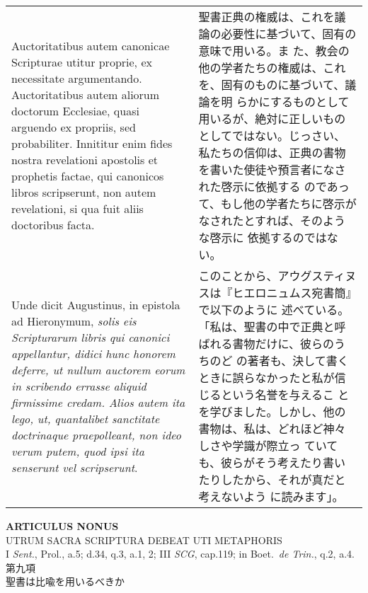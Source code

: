 \documentclass[10pt]{jsarticle}
\begin{document}
\begin{longtable}{p{21em}p{21em}}
\\

Auctoritatibus autem canonicae Scripturae utitur proprie, ex
necessitate argumentando. Auctoritatibus autem aliorum doctorum
Ecclesiae, quasi arguendo ex propriis, sed probabiliter. Innititur
enim fides nostra revelationi apostolis et prophetis factae, qui
canonicos libros scripserunt, non autem revelationi, si qua fuit aliis
doctoribus facta.


&

聖書正典の権威は、これを議論の必要性に基づいて、固有の意味で用いる。ま
た、教会の他の学者たちの権威は、これを、固有のものに基づいて、議論を明
らかにするものとして用いるが、絶対に正しいものとしてではない。じっさい、
私たちの信仰は、正典の書物を書いた使徒や預言者になされた啓示に依拠する
のであって、もし他の学者たちに啓示がなされたとすれば、そのような啓示に
依拠するのではない。

\\

Unde dicit Augustinus, in epistola ad Hieronymum, {\itshape solis eis
Scripturarum libris qui canonici appellantur, didici hunc honorem
deferre, ut nullum auctorem eorum in scribendo errasse aliquid
firmissime credam. Alios autem ita lego, ut, quantalibet sanctitate
doctrinaque praepolleant, non ideo verum putem, quod ipsi ita
senserunt vel scripserunt}.


&

このことから、アウグスティヌスは『ヒエロニュムス宛書簡』で以下のように
述べている。「私は、聖書の中で正典と呼ばれる書物だけに、彼らのうちのど
の著者も、決して書くときに誤らなかったと私が信じるという名誉を与えるこ
とを学びました。しかし、他の書物は、私は、どれほど神々しさや学識が際立っ
ていても、彼らがそう考えたり書いたりしたから、それが真だと考えないよう
に読みます」。

\end{longtable}
\newpage


\begin{center}
 {\Large {\bf ARTICULUS NONUS}}\\
 {\large UTRUM SACRA SCRIPTURA DEBEAT UTI METAPHORIS}\\
 {\footnotesize I {\itshape Sent.}, Prol., a.5; d.34, q.3, a.1, 2; III
 {\itshape SCG}, cap.119; in Boet.~{\itshape de Trin.}, q.2, a.4.}\\
 {\Large 第九項\\聖書は比喩を用いるべきか}
\end{center}
\end{document}
